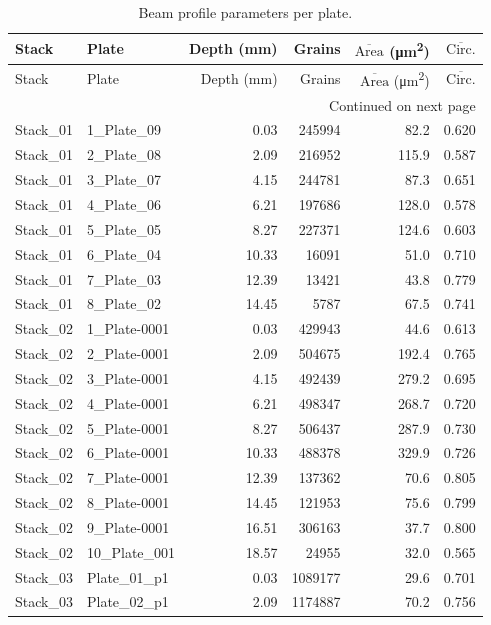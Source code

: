 \documentclass[12pt,a4paper]{article}
\begin{document}
\begin{longtable}{llrrrr}
\caption{Beam profile parameters per plate.}
\label{tab:beamprofile}\\
\toprule
Stack & Plate & Depth (mm) & Grains & $\overline{\text{Area}}$ (\si{\micro\meter\squared}) & $\overline{\text{Circ.}}$ \\
\midrule
\endfirsthead
\toprule
Stack & Plate & Depth (mm) & Grains & $\overline{\text{Area}}$ (\si{\micro\meter\squared}) & $\overline{\text{Circ.}}$ \\
\midrule
\endhead
\midrule \multicolumn{6}{r}{Continued on next page} \\
\endfoot
\bottomrule
\endlastfoot
Stack\_01 & 1\_Plate\_09 & 0.03 & 245994 & 82.2 & 0.620 \\
Stack\_01 & 2\_Plate\_08 & 2.09 & 216952 & 115.9 & 0.587 \\
Stack\_01 & 3\_Plate\_07 & 4.15 & 244781 & 87.3 & 0.651 \\
Stack\_01 & 4\_Plate\_06 & 6.21 & 197686 & 128.0 & 0.578 \\
Stack\_01 & 5\_Plate\_05 & 8.27 & 227371 & 124.6 & 0.603 \\
Stack\_01 & 6\_Plate\_04 & 10.33 & 16091 & 51.0 & 0.710 \\
Stack\_01 & 7\_Plate\_03 & 12.39 & 13421 & 43.8 & 0.779 \\
Stack\_01 & 8\_Plate\_02 & 14.45 & 5787 & 67.5 & 0.741 \\
Stack\_02 & 1\_Plate-0001 & 0.03 & 429943 & 44.6 & 0.613 \\
Stack\_02 & 2\_Plate-0001 & 2.09 & 504675 & 192.4 & 0.765 \\
Stack\_02 & 3\_Plate-0001 & 4.15 & 492439 & 279.2 & 0.695 \\
Stack\_02 & 4\_Plate-0001 & 6.21 & 498347 & 268.7 & 0.720 \\
Stack\_02 & 5\_Plate-0001 & 8.27 & 506437 & 287.9 & 0.730 \\
Stack\_02 & 6\_Plate-0001 & 10.33 & 488378 & 329.9 & 0.726 \\
Stack\_02 & 7\_Plate-0001 & 12.39 & 137362 & 70.6 & 0.805 \\
Stack\_02 & 8\_Plate-0001 & 14.45 & 121953 & 75.6 & 0.799 \\
Stack\_02 & 9\_Plate-0001 & 16.51 & 306163 & 37.7 & 0.800 \\
Stack\_02 & 10\_Plate\_001 & 18.57 & 24955 & 32.0 & 0.565 \\
Stack\_03 & Plate\_01\_p1 & 0.03 & 1089177 & 29.6 & 0.701 \\
Stack\_03 & Plate\_02\_p1 & 2.09 & 1174887 & 70.2 & 0.756 \\

\end{longtable}
\end{document}
